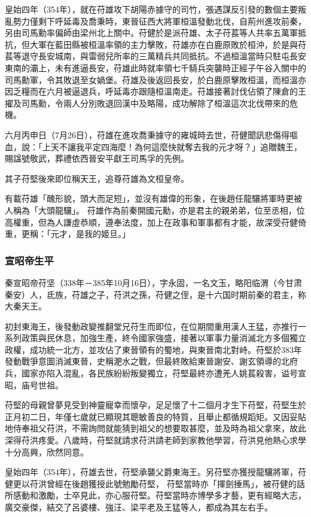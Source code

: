 皇始四年（354年），就在苻雄攻下胡陽赤據守的司竹，張遇謀反引發的數個主要叛亂勢力僅剩下呼延毒及喬秉時，東晉征西大將軍桓溫發動北伐，自荊州進攻前秦，另由司馬勳率偏師由梁州北上關中。苻健於是派苻雄、太子苻萇等人共率五萬軍抵抗，但大軍在藍田縣被桓溫率領的主力擊敗，苻雄亦在白鹿原敗於桓沖，於是與苻萇等退守長安城南，與雷弱兒所率的三萬精兵共同抵抗。不過桓溫當時只駐屯長安東南的灞上，未有進逼長安，苻雄此時就率領七千騎兵突襲時正經子午谷入關中的司馬勳軍，令其敗退至女媧堡。苻雄及後返回長安，於白鹿原擊敗桓溫，而桓溫亦因乏糧而在六月被逼退兵，呼延毒亦跟隨桓溫南走。苻雄接著討伐佔領了陳倉的王擢及司馬勳，令兩人分別敗退回漢中及略陽，成功解除了桓溫這次北伐帶來的危機。

六月丙申日（7月26日），苻雄在進攻喬秉據守的雍城時去世，苻健聞訊悲傷得嘔血，說：「上天不讓我平定四海麼！為何這麼快就奪去我的元才呀？」追贈魏王，賜諡號敬武，葬禮依西晉安平獻王司馬孚的先例。

其子苻堅後來即位稱天王，追尊苻雄為文桓皇帝。

有載苻雄「醜形貌，頭大而足短」，並沒有雄偉的形象，在後趙任龍驤將軍時更被人稱為「大頭龍驤」。
苻雄作為前秦開國元勳，亦是君主的親弟弟，位至丞相，位高權重，但為人謙虛恭順，遵奉法度，加上在政事和軍事都有才能，故深受苻健倚重，更稱：「元才，是我的姬旦。」

\subsubsection{宣昭帝生平}

秦宣昭帝苻坚（338年－385年10月16日），字永固，一名文玉，略阳临渭（今甘肃秦安）人，氐族，苻雄之子，苻洪之孫，苻健之侄，是十六国时期前秦的君主，称大秦天王。

初封東海王，後發動政變推翻堂兄苻生而即位，在位期間重用漢人王猛，亦推行一系列政策與民休息，加強生產，終令國家強盛，接著以軍事力量消滅北方多個獨立政權，成功統一北方，並攻佔了東晉領有的蜀地，與東晉南北對峙。苻堅於383年發動戰爭意圖消滅東晉，史稱淝水之戰，但最終敗給東晉謝安、謝玄領導的北府兵，國家亦陷入混亂，各民族紛紛叛變獨立，苻堅最終亦遭羌人姚萇殺害，谥号宣昭，庙号世祖。

苻堅的母親曾夢見受到神靈寵幸而懷孕，足足懷了十二個月才生下苻堅，苻堅生於正月初二日，年僅七歲就已顯現其聰敏善良的特質，且舉止都循規蹈矩。又因妥貼地侍奉祖父苻洪，不需詢問就能猜到祖父的想要取甚麼，並及時為祖父拿來，故此深得苻洪疼愛。八歲時，苻堅就請求苻洪請老師到家教他學習，苻洪見他熱心求學十分高興，欣然同意。

皇始四年（354年），苻雄去世，苻堅承襲父爵東海王。另苻堅亦獲授龍驤將軍，苻健更以苻洪曾經在後趙獲授此號勉勵苻堅， 苻堅當時亦「揮劍捶馬」，被苻健的話所感動和激勵，士卒見此，亦心服苻堅。苻堅當時亦博學多才藝，更有經略大志，廣交豪傑，結交了呂婆樓、強汪、梁平老及王猛等人，都成為其左右手。

